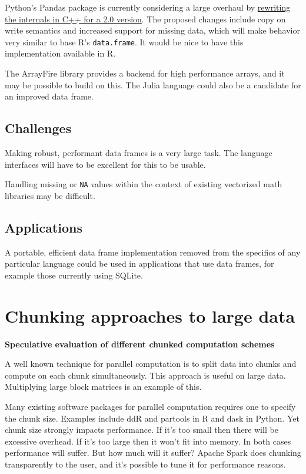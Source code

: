\documentclass[12pt]{article}
\begin{document}
Python's Pandas package is currently considering a large overhaul by
\href{https://pandas-dev.github.io/pandas2/internal-architecture.html#building-libpandas-in-c-11-14-for-lowest-level-implementation-tier}{rewriting
the internals in C++ for a 2.0 version}. The proposed changes include
copy on write semantics and increased support for missing data, which will
make behavior very similar to base R's \texttt{data.frame}.
It would be nice to have this implementation available in R.

The ArrayFire library provides a backend for high performance arrays, and
it may be possible to build on this.
The Julia language could also be a candidate for an improved data frame.

\subsection{Challenges}

Making robust, performant data frames is a very large task. The language
interfaces will have to be excellent for this to be usable.

Handling missing or \texttt{NA} values within the context of existing
vectorized math libraries may be difficult.

\subsection{Applications}

A portable, efficient data frame implementation removed from the specifics
of any particular language could be used in applications that use
data frames, for example those currently using SQLite.

\section{Chunking approaches to large data}

\textbf{Speculative evaluation of different chunked computation schemes}

A well known technique for parallel computation is to split data into
chunks and compute on each chunk simultaneously. This approach 
is useful on large data. Multiplying large block matrices is an example of this.

Many existing software packages for parallel computation requires one to specify the
chunk size. Examples include ddR \cite{R-ddR} and partools
\cite{R-partools} in R and dask in Python.
Yet chunk size strongly impacts
performance. If it's too small then there will be excessive overhead. If
it's too large then it won't fit into memory. In both cases performance
will suffer. But how much will it suffer?
Apache Spark does chunking transparently to the user, and it's possible to
tune it for performance reasons.
\end{document}
